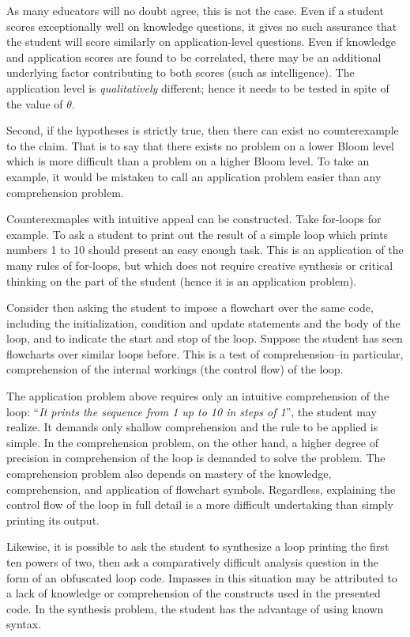 \documentclass[]{interact}
\theoremstyle{plain}
\theoremstyle{definition}
\theoremstyle{remark}
\begin{document}
As many educators will no doubt agree, this is not the case. Even if a student
scores exceptionally well on knowledge questions, it gives no such assurance
that the student will score similarly on application-level questions.  Even if
knowledge and application scores are found to be correlated, there may be an
additional underlying factor contributing to both scores (such as
intelligence).  The application level is \emph{qualitatively} different; hence
it needs to be tested in spite of the value of $\theta$.

Second, if the hypotheses is strictly true, then there can exist no
counterexample to the claim.  That is to say that there exists no problem on a
lower Bloom level which is more difficult than a problem on a higher Bloom
level.  To take an example, it would be mistaken to call an application problem
easier than any comprehension problem. 

Counterexmaples with intuitive appeal can be constructed.  Take for-loops for
example.  To ask a student to print out the result of a simple loop which
prints numbers 1 to 10 should present an easy enough task.  This is an
application of the many rules of for-loops, but which does not require creative
synthesis or critical thinking on the part of the student (hence it is an
application problem). 

Consider then asking the student to impose a flowchart over the same code,
including the initialization, condition and update statements and the body of
the loop, and to indicate the start and stop of the loop.  Suppose the student
has seen flowcharts over similar loops before.  This is a test of
comprehension--in particular, comprehension of the internal workings (the
control flow) of the loop.    

The application problem above requires only an intuitive comprehension of the
loop: ``\emph{It prints the sequence from 1 up to 10 in steps of 1}'', the
student may realize.  It demands only shallow comprehension and the rule to be
applied is simple.  In the comprehension problem, on the other hand, a higher
degree of precision in comprehension of the loop is demanded to solve the
problem.  The comprehension problem also depends on mastery of the knowledge,
comprehension, and application of flowchart symbols.  Regardless, explaining
the control flow of the loop in full detail is a more difficult undertaking
than simply printing its output. 

Likewise, it is possible to ask the student to synthesize a loop printing the
first ten powers of two, then ask a comparatively difficult analysis question
in the form of an obfuscated loop code.  Impasses in this situation may be
attributed to a lack of knowledge or comprehension of the constructs used in
the presented code.  In the synthesis problem, the student has the advantage
of using known syntax. 
\end{document}
